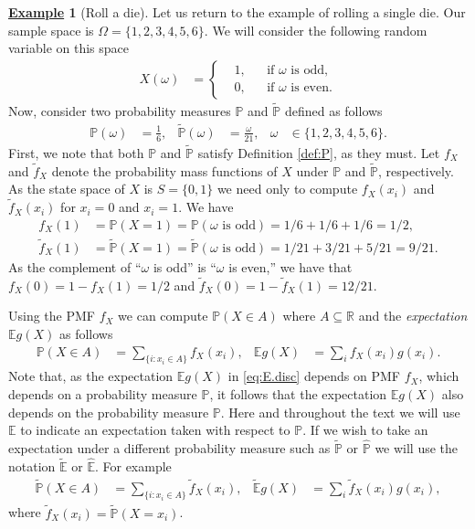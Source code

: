 \documentclass[12pt]{book}
\numberwithin{equation}{chapter}
\theoremstyle{plain}
\numberwithin{theorem}{section}
\theoremstyle{definition}
\newtheorem{example}[theorem]{\underline{Example}}
\numberwithin{exercise}{chapter}
\newcommand{\<}{\langle}
\renewcommand{\>}{\rangle}
\renewcommand{\(}{\left(}
\renewcommand{\)}{\right)}
\renewcommand{\[}{\left[}
\renewcommand{\]}{\right]}
\newcommand\Eb{\mathds{E}}
\newcommand\Pb{\mathds{P}}
\newcommand\Rb{\mathds{R}}
\newcommand\om{\omega}
\newcommand\Om{\Omega}
\newcommand\Pbh{\widehat{\Pb}}
\newcommand\Ebh{\widehat{\Eb}}
\newcommand\Ebt{\widetilde{\Eb}}
\newcommand\Pbt{\widetilde{\Pb}}
\newcommand\ft{\widetilde{f}}
\theoremstyle{definition}
\numberwithin{question}{section}
\begin{document}
\begin{example}[Roll a die]
\label{ex:die.roll.rv}
Let us return to the example of rolling a single die.  Our sample space is $\Om = \{1,2,3,4,5,6\}$.  We will consider the following random variable on this space
\begin{align}
X(\om)
	&=	\left\{ \begin{aligned}
			&1 , & & \text{if $\om$ is odd} , \\
			&0 , & & \text{if $\om$ is even} .
			\end{aligned} \right.
\end{align}
Now, consider two probability measures $\Pb$ and $\Pbt$ defined as follows
\begin{align}
\Pb(\om)
	&=	\frac{1}{6} , & 
\Pbt(\om)
	&=	\frac{\om}{21} , &
\om 
	&\in \{ 1, 2, 3, 4, 5, 6 \} .
\end{align}
First, we note that both $\Pb$ and $\Pbt$ satisfy Definition \ref{def:P}, as they must.
Let $f_X$ and $\ft_X$ denote the probability mass functions of $X$ under $\Pb$ and $\Pbt$, respectively.  
As the state space of $X$ is $S = \{ 0 , 1 \}$ we need only to compute $f_X(x_i)$ and $\ft_X(x_i)$ for $x_i = 0$ and $x_i = 1$.
We have
\begin{align}
f_X(1)
	&=	\Pb( X = 1 )
	=		\Pb(  \text{$\om$ is odd}  )
	=		1/6 + 1/6 + 1/6 
	= 	1/2 , \\
\widetilde{f}_X(1)
	&=	\Pbt( X = 1 )
	=		\Pbt( \text{$\om$ is odd}  )
	=		1/21 + 3/21 + 5/21 
	= 	9/21 .
\end{align}
As the complement of ``$\om$ is odd'' is ``$\om$ is even,'' we have that $f_X(0) = 1 - f_X(1) = 1/2$ and $\ft_X(0) = 1 - \ft_X(1) = 12/21$.
\end{example}

\noindent
Using the PMF $f_X$ we can compute $\Pb(X \in A)$ where $A \subseteq \Rb$ and the \textit{expectation} $\Eb g(X)$ as follows
\begin{align}
\Pb( X \in A)
	&=	\sum_{\{i : x_i \in A\}} f_X(x_i) , &
\Eb g(X)
	&=	\sum_i f_X(x_i) g(x_i) . \label{eq:E.disc}
\end{align}
Note that, as the expectation $\Eb g(X)$ in \eqref{eq:E.disc} depends on PMF $f_X$, which depends on a probability measure $\Pb$, it follows that the expectation $\Eb g(X)$ also depends on the probability measure $\Pb$.  Here and throughout the text we will use $\Eb$ to indicate an expectation taken with respect to $\Pb$.
If we wish to take an expectation under a different probability measure such as $\Pbt$ or $\Pbh$ we will use the notation $\Ebt$ or $\Ebh$.  For example
\begin{align}
\Pbt( X \in A)
	&=	\sum_{\{i : x_i \in A\}} \ft_X(x_i) , &
\Ebt g(X)
	&=	\sum_i \ft_X(x_i) g(x_i) ,
\end{align}
where $\ft_X(x_i) = \Pbt(X = x_i)$.
\end{document}
